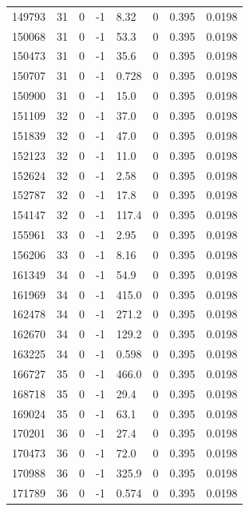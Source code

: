 \documentclass[preview]{standalone}
\begin{document}
{{{{\begin{tabular}{L{1.2cm}C{1.2cm} C{0.3cm}C{0.5cm} C{1.4cm}C{1.4cm} C{1.4cm}C{1.4cm}}
  149793  &    31  & 0     & -1 &  8.32  & 0  & 0.395 &  0.0198   \\ 
  150068  &    31  & 0     & -1 &  53.3  & 0  & 0.395 &  0.0198   \\ 
  150473  &    31  & 0     & -1 &  35.6  & 0  & 0.395 &  0.0198   \\ 
  150707  &    31  & 0     & -1 &  0.728  & 0  & 0.395 &  0.0198   \\ 
  150900  &    31  & 0     & -1 &  15.0  & 0  & 0.395 &  0.0198   \\ 
  151109  &    32  & 0     & -1 &  37.0  & 0  & 0.395 &  0.0198   \\ 
  151839  &    32  & 0     & -1 &  47.0  & 0  & 0.395 &  0.0198   \\ 
  152123  &    32  & 0     & -1 &  11.0  & 0  & 0.395 &  0.0198   \\ 
  152624  &    32  & 0     & -1 &  2.58  & 0  & 0.395 &  0.0198   \\ 
  152787  &    32  & 0     & -1 &  17.8  & 0  & 0.395 &  0.0198   \\ 
  154147  &    32  & 0     & -1 &  117.4  & 0  & 0.395 &  0.0198   \\ 
  155961  &    33  & 0     & -1 &  2.95  & 0  & 0.395 &  0.0198   \\ 
  156206  &    33  & 0     & -1 &  8.16  & 0  & 0.395 &  0.0198   \\ 
  161349  &    34  & 0     & -1 &  54.9  & 0  & 0.395 &  0.0198   \\ 
  161969  &    34  & 0     & -1 &  415.0  & 0  & 0.395 &  0.0198   \\ 
  162478  &    34  & 0     & -1 &  271.2  & 0  & 0.395 &  0.0198   \\ 
  162670  &    34  & 0     & -1 &  129.2  & 0  & 0.395 &  0.0198   \\ 
  163225  &    34  & 0     & -1 &  0.598  & 0  & 0.395 &  0.0198   \\ 
  166727  &    35  & 0     & -1 &  466.0  & 0  & 0.395 &  0.0198   \\ 
  168718  &    35  & 0     & -1 &  29.4  & 0  & 0.395 &  0.0198   \\ 
  169024  &    35  & 0     & -1 &  63.1  & 0  & 0.395 &  0.0198   \\ 
  170201  &    36  & 0     & -1 &  27.4  & 0  & 0.395 &  0.0198   \\ 
  170473  &    36  & 0     & -1 &  72.0  & 0  & 0.395 &  0.0198   \\ 
  170988  &    36  & 0     & -1 &  325.9  & 0  & 0.395 &  0.0198   \\ 
  171789  &    36  & 0     & -1 &  0.574  & 0  & 0.395 &  0.0198   \\ 
\hline 
\end{tabular} 

}}}}
\end{document}
